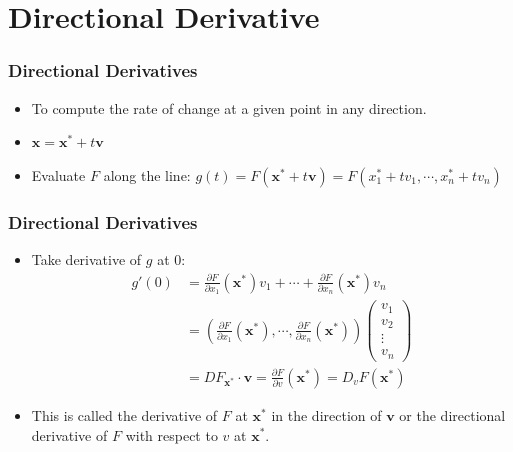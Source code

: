 \documentclass[9pt,aspectratio=169]{beamer}
\begin{document}
\section{Directional Derivative}
\begin{frame}
	\frametitle{Directional Derivatives}
	\begin{itemize}
		\item To compute the rate of change at a given point in any direction.
		\item $\mathbf{x} = \mathbf{x^*}+t\mathbf{v}$
		\item Evaluate $F$ along the line: $g(t) = F(\mathbf{x^*}+t\mathbf{v}) = F(x_1^*+tv_1,\cdots,x_n^*+tv_n)$ 
	\end{itemize}
\end{frame}



\begin{frame}
	\frametitle{Directional Derivatives}
	\begin{itemize}
		\item Take derivative of $g$ at 0: 
		\begin{align*}
            g'(0) &= \frac{\partial F}{\partial
              x_1}(\mathbf{x^*})v_1+\cdots+\frac{\partial F}{\partial
              x_n}(\mathbf{x^*})v_n \\
            & = \left(\frac{\partial F}{\partial
                  x_1}(\mathbf{x^*}),\cdots,\frac{\partial F}{\partial
                  x_n}(\mathbf{x^*})\right)\left(
                \begin{array}{c}
                    v_1\\
                    v_2\\
                    \vdots \\
                    v_n
                \end{array}
            \right) \\
            &= DF_{\mathbf{x^*}}\cdot\mathbf{v} = \frac{\partial F}{\partial
              v}(\mathbf{x}^*) = D_vF(\mathbf{x}^*)
		\end{align*}
		\item This is called the derivative of $F$ at $\mathbf{x^*}$ in the
        direction of $\mathbf{v}$ or the directional derivative of $F$ with
        respect to $v$ at $\mathbf{x}^*$.
	\end{itemize}
\end{frame}
\end{document}
